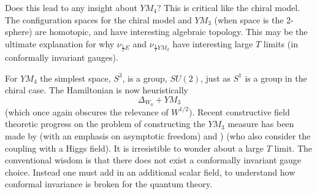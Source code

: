 \documentclass{amsart}
\theoremstyle{conjecture}
\theoremstyle{definition}
\theoremstyle{question}
\theoremstyle{questions}
\theoremstyle{remark}
\theoremstyle{remarks}
\theoremstyle{example}
\numberwithin{equation}{section}
\begin{document}
Does this lead to any insight about $YM_4$? This is critical like the chiral model. The configuration spaces for the chiral model and $YM_3$ (when space is
the 2-sphere) are homotopic, and have interesting algebraic topology. This may be the ultimate explanation for why $\nu_{\frac 1T E}$ and $\nu_{\frac 1T YM_2}$ have interesting large $T$ limits (in conformally invariant gauges).

For $YM_4$ the simplest space, $S^{3}$, is a group, $SU(2)$, just as $S^1$ is a group in the chiral case. The Hamiltonian is now heuristically
$$\Delta_{W_{0}}+YM_3$$
(which once again obscures the relevance of $W^{1/2}$).
Recent constructive field theoretic progress on the problem of constructing the $YM_3$ measure has been made by \cite{CC} (with an emphasis on asymptotic freedom) and \cite{CCHS}) (who also consider the coupling with a Higgs field).
It is irresistible to wonder about a large $T$ limit. The conventional wisdom is that
there does not exist a conformally invariant gauge choice. Instead one must add in an additional scalar field, to understand how conformal invariance
is broken for the quantum theory.
\end{document}
